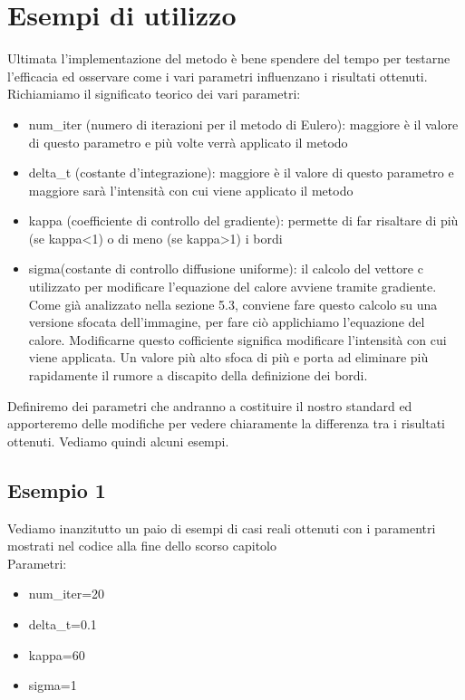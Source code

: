 \section{Esempi di utilizzo}
Ultimata l'implementazione del metodo è bene spendere del tempo per testarne l'efficacia ed osservare come i vari parametri influenzano i risultati ottenuti.\\
Richiamiamo il significato teorico dei vari parametri:
\begin{itemize}
    \item num\_iter (numero di iterazioni per il metodo di Eulero): maggiore è il valore di questo parametro e più volte verrà applicato il metodo
    \item delta\_t (costante d'integrazione): maggiore è il valore di questo parametro e maggiore sarà l'intensità con cui viene applicato il metodo\\
    \item kappa (coefficiente di controllo del gradiente): permette di far risaltare di più (se kappa<1) o di meno (se kappa>1) i bordi
    \item sigma(costante di controllo diffusione uniforme): il calcolo del vettore c utilizzato per modificare l'equazione del calore avviene tramite gradiente. Come già analizzato nella sezione 5.3, conviene fare questo calcolo su una versione sfocata dell'immagine, per fare ciò applichiamo l'equazione del calore. Modificarne questo cofficiente significa modificare l'intensità con cui viene applicata. Un valore più alto sfoca di più e porta ad eliminare più rapidamente il rumore a discapito della definizione dei bordi.
\end{itemize}
Definiremo dei parametri che andranno a costituire il nostro standard ed apporteremo delle modifiche per vedere chiaramente la differenza tra i risultati ottenuti.
Vediamo quindi alcuni esempi.

\newpage
\subsection{Esempio 1}
Vediamo inanzitutto un paio di esempi di casi reali ottenuti con i paramentri mostrati nel codice alla fine dello scorso capitolo\\
Parametri:
\begin{itemize}
    \item num\_iter=20
    \item delta\_t=0.1
    \item kappa=60
    \item sigma=1
\end{itemize}


